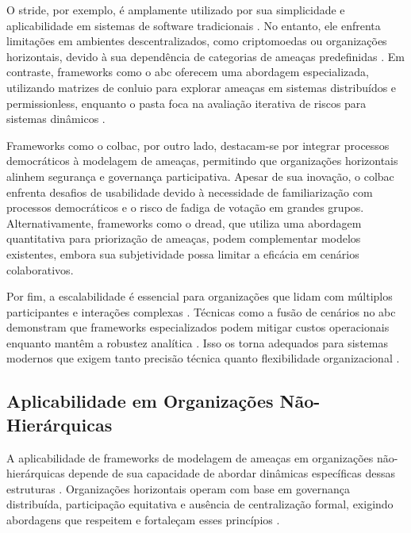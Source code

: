 O \gls{stride}, por exemplo, é amplamente utilizado por sua simplicidade e
aplicabilidade em sistemas de software tradicionais
\cite{ThreatModelingdesigningForSecurity}. No entanto, ele
enfrenta limitações em ambientes descentralizados, como criptomoedas
ou organizações horizontais, devido à sua dependência de categorias de
ameaças predefinidas \cite{STRIDEthreatmodelingforcyberphysical}.
Em contraste, frameworks como o \gls{abc} oferecem uma abordagem especializada,
utilizando matrizes de conluio para explorar ameaças em
sistemas distribuídos e permissionless, enquanto o \gls{pasta} foca na
avaliação iterativa de riscos para sistemas dinâmicos
\cite{AbcCrypto, RiskCentricThreatModeling}.

Frameworks como o \gls{colbac}, por outro lado, destacam-se por integrar
processos democráticos à modelagem de ameaças, permitindo que
organizações horizontais alinhem segurança e governança participativa.
Apesar de sua inovação, o \gls{colbac} enfrenta desafios de usabilidade
devido à necessidade de familiarização com processos democráticos e o
risco de fadiga de votação em grandes grupos. Alternativamente,
frameworks como o \gls{dread}, que utiliza uma abordagem quantitativa para
priorização de ameaças, podem complementar modelos existentes, embora
sua subjetividade possa limitar a eficácia em cenários colaborativos.

Por fim, a escalabilidade é essencial para organizações que lidam com
múltiplos participantes e interações complexas \cite{AbcCrypto}.
Técnicas como a fusão de cenários no \gls{abc} demonstram que frameworks especializados
podem mitigar custos operacionais enquanto mantêm a robustez
analítica \cite{AbcCrypto}. Isso os torna adequados para sistemas modernos que exigem
tanto precisão técnica quanto flexibilidade organizacional \cite{Colbac}.

\subsection{Aplicabilidade em Organizações Não-Hierárquicas}
\label{subsec:applicability_non_hierarchical}

A aplicabilidade de frameworks de modelagem de ameaças em organizações
não-hierárquicas depende de sua capacidade de abordar dinâmicas
específicas dessas estruturas \cite{Colbac, ThreatModelingASystematicLiteratureReview}.
Organizações horizontais operam com base em governança distribuída,
participação equitativa e ausência de centralização formal,
exigindo abordagens que respeitem e fortaleçam esses princípios \cite{EverydayRevolutions}.

